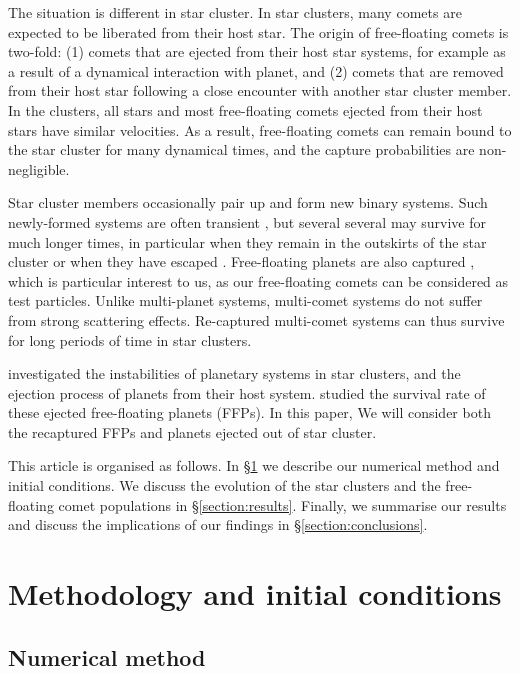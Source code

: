 \documentclass[usenatbib]{mn2e}
\begin{document}

The situation is different in star cluster. In star clusters, many comets are expected to be liberated from their host star. The origin of free-floating comets is two-fold: (1) comets that are ejected from their host star systems, for example as a result of a dynamical interaction with planet, and (2) comets that are removed from their host star following a close encounter with another star cluster member. In the clusters, all stars and most free-floating comets ejected from their host stars have similar velocities. As a result, free-floating comets can remain bound to the star cluster for many dynamical times, and the capture probabilities are non-negligible.

Star cluster members occasionally pair up and form new binary systems. Such newly-formed systems are often transient \citep[e.g.,][]{Moeckel:2011aa}, but several several may survive for much longer times, in particular when they remain in the outskirts of the star cluster or when they have escaped \citep{Kouwenhoven:2010aa}. Free-floating planets are also captured \citep{Perets:2012aa}, which is particular interest to us, as our free-floating comets can be considered as test particles. Unlike multi-planet systems, multi-comet systems do not suffer from strong scattering effects. Re-captured multi-comet systems can thus survive for long periods of time in star clusters.


\cite{Spurzem:2009aa} investigated the instabilities of planetary systems in star clusters, and the ejection process of planets from their host system.  \cite{Wang:2015ab}  studied the survival rate of these ejected free-floating planets (FFPs). In this paper, We will consider both the recaptured FFPs and planets ejected out of star cluster.

This article is organised as follows. In \S\ref{section:method} we describe our numerical method and initial conditions. We discuss the evolution of the star clusters and the free-floating comet populations in \S\ref{section:results}. Finally, we summarise our results and discuss the implications of our findings in \S\ref{section:conclusions}.

\section{Methodology and initial conditions} \label{section:method}


\subsection{Numerical method}
\end{document}
